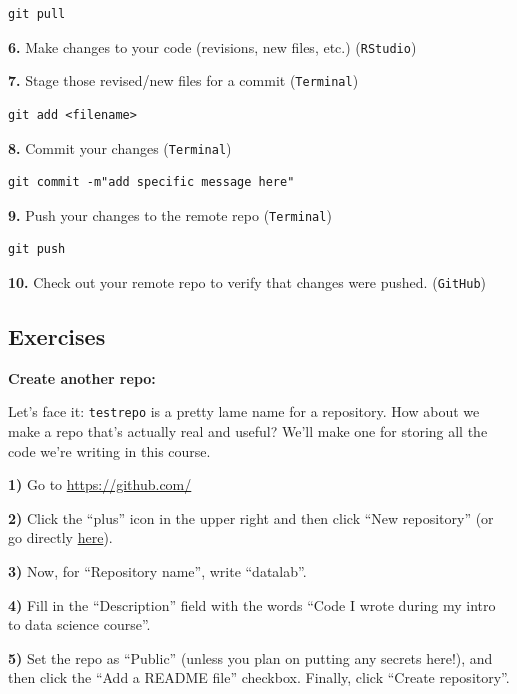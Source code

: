 \documentclass[]{book}
\begin{document}
\begin{verbatim}
git pull
\end{verbatim}

\textbf{6.} Make changes to your code (revisions, new files, etc.) (\texttt{RStudio})

\textbf{7.} Stage those revised/new files for a commit (\texttt{Terminal})

\begin{verbatim}
git add <filename>
\end{verbatim}

\textbf{8.} Commit your changes (\texttt{Terminal})

\begin{verbatim}
git commit -m"add specific message here"
\end{verbatim}

\textbf{9.} Push your changes to the remote repo (\texttt{Terminal})

\begin{verbatim}
git push
\end{verbatim}

\textbf{10.} Check out your remote repo to verify that changes were pushed. (\texttt{GitHub})

\hypertarget{exercises-11}{%
\subsection*{Exercises}\label{exercises-11}}

\textbf{Create another repo:}

Let's face it: \texttt{testrepo} is a pretty lame name for a repository. How about we make a repo that's actually real and useful? We'll make one for storing all the code we're writing in this course.

\textbf{1)} Go to \url{https://github.com/}

\textbf{2)} Click the ``plus'' icon in the upper right and then click ``New repository'' (or go directly \href{https://github.com/new}{here}).

\textbf{3)} Now, for ``Repository name'', write ``datalab''.

\textbf{4)} Fill in the ``Description'' field with the words ``Code I wrote during my intro to data science course''.

\textbf{5)} Set the repo as ``Public'' (unless you plan on putting any secrets here!), and then click the ``Add a README file'' checkbox. Finally, click ``Create repository''.
\end{document}
